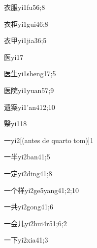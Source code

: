 \begin{verbete}{衣服}{yi1fu5}{6;8}
\end{verbete}
\begin{verbete}{衣柜}{yi1gui4}{6;8}
\end{verbete}
\begin{verbete}{衣甲}{yi1jia3}{6;5}
\end{verbete}
\begin{verbete}{医}{yi1}{7}
\end{verbete}
\begin{verbete}{医生}{yi1sheng1}{7;5}
\end{verbete}
\begin{verbete}{医院}{yi1yuan5}{7;9}
\end{verbete}
\begin{verbete}{遗案}{yi1'an4}{12;10}
\end{verbete}
\begin{verbete}{毉}{yi1}{18}
\end{verbete}
\begin{verbete}{一}{yi2}[(antes de quarto tom)]{1}
\end{verbete}
\begin{verbete}{一半}{yi2ban4}{1;5}
\end{verbete}
\begin{verbete}{一定}{yi2ding4}{1;8}
\end{verbete}
\begin{verbete}{一个样}{yi2ge5yang4}{1;2;10}
\end{verbete}
\begin{verbete}{一共}{yi2gong4}{1;6}
\end{verbete}
\begin{verbete}{一会儿}{yi2hui4r5}{1;6;2}
\end{verbete}
\begin{verbete}{一下}{yi2xia4}{1;3}
\end{verbete}
